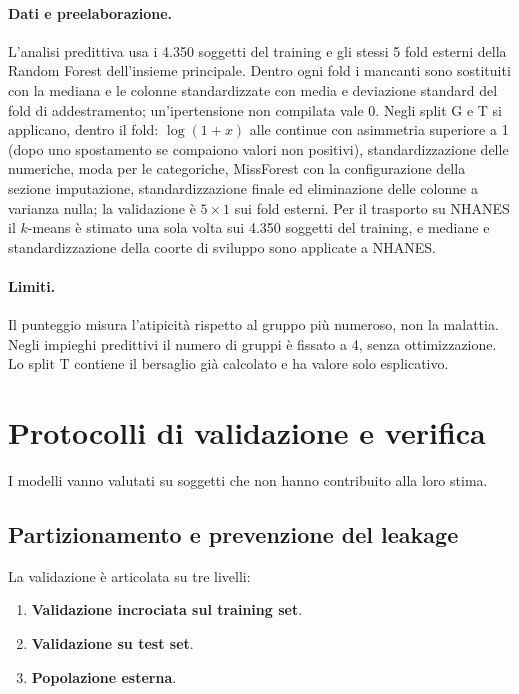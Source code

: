 \documentclass[a4paper, 12pt, oneside]{book}
\begin{document}
\paragraph{Dati e preelaborazione.} L'analisi predittiva usa i 4.350 soggetti del training e gli stessi 5 fold esterni della Random Forest dell'insieme principale. Dentro ogni fold i mancanti sono sostituiti con la mediana e le colonne standardizzate con media e deviazione standard del fold di addestramento; un'ipertensione non compilata vale 0. Negli split G e T si applicano, dentro il fold: $\log(1+x)$ alle continue con asimmetria superiore a 1 (dopo uno spostamento se compaiono valori non positivi), standardizzazione delle numeriche, moda per le categoriche, MissForest con la configurazione della sezione imputazione, standardizzazione finale ed eliminazione delle colonne a varianza nulla; la validazione è $5 \times 1$ sui fold esterni. Per il trasporto su NHANES il $k$-means è stimato una sola volta sui 4.350 soggetti del training, e mediane e standardizzazione della coorte di sviluppo sono applicate a NHANES.

\paragraph{Limiti.} Il punteggio misura l'atipicità rispetto al gruppo più numeroso, non la malattia. Negli impieghi predittivi il numero di gruppi è fissato a 4, senza ottimizzazione. Lo split T contiene il bersaglio già calcolato e ha valore solo esplicativo.

\section{Protocolli di validazione e verifica}

I modelli vanno valutati su soggetti che non hanno contribuito alla loro stima.

\subsection{Partizionamento e prevenzione del leakage}

La validazione è articolata su tre livelli:
\begin{enumerate}
	\item \textbf{Validazione incrociata sul training set}.
	\item \textbf{Validazione su test set}.
	\item \textbf{Popolazione esterna}.
\end{enumerate}
\end{document}
